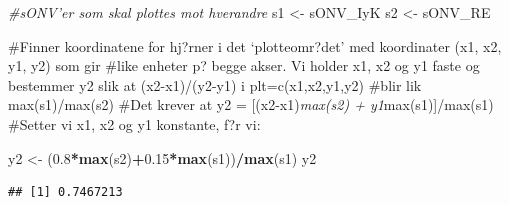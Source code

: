 \documentclass[]{article}
\newenvironment{Shaded}{\begin{snugshade}}{\end{snugshade}}
\newcommand{\CommentTok}[1]{\textcolor[rgb]{0.56,0.35,0.01}{\textit{#1}}}
\newcommand{\FloatTok}[1]{\textcolor[rgb]{0.00,0.00,0.81}{#1}}
\newcommand{\KeywordTok}[1]{\textcolor[rgb]{0.13,0.29,0.53}{\textbf{#1}}}
\newcommand{\NormalTok}[1]{#1}
\newcommand{\OperatorTok}[1]{\textcolor[rgb]{0.81,0.36,0.00}{\textbf{#1}}}
\newcommand{\StringTok}[1]{\textcolor[rgb]{0.31,0.60,0.02}{#1}}
\begin{document}
\begin{Shaded}
\begin{Highlighting}[]
\CommentTok{#sONV'er som skal plottes mot hverandre}
\NormalTok{s1 <-}\StringTok{ }\NormalTok{sONV_IyK}
\NormalTok{s2 <-}\StringTok{ }\NormalTok{sONV_RE}
\end{Highlighting}
\end{Shaded}

\#Finner koordinatene for hj?rner i det `plotteomr?det' med koordinater
(x1, x2, y1, y2) som gir \#like enheter p? begge akser. Vi holder x1, x2
og y1 faste og bestemmer y2 slik at (x2-x1)/(y2-y1) i plt=c(x1,x2,y1,y2)
\#blir lik max(s1)/max(s2) \#Det krever at y2 = {[}(x2-x1)\emph{max(s2)
+ y1}max(s1){]}/max(s1) \#Setter vi x1, x2 og y1 konstante, f?r vi:

\begin{Shaded}
\begin{Highlighting}[]
\NormalTok{y2 <-}\StringTok{ }\NormalTok{(}\FloatTok{0.8}\OperatorTok{*}\KeywordTok{max}\NormalTok{(s2)}\OperatorTok{+}\FloatTok{0.15}\OperatorTok{*}\KeywordTok{max}\NormalTok{(s1))}\OperatorTok{/}\KeywordTok{max}\NormalTok{(s1)}
\NormalTok{y2}
\end{Highlighting}
\end{Shaded}

\begin{verbatim}
## [1] 0.7467213
\end{verbatim}
\end{document}
